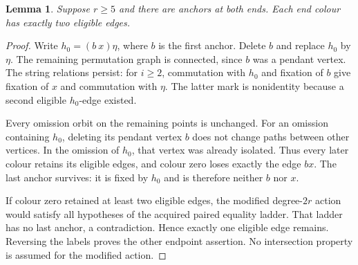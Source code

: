 \documentclass[11pt,a4paper]{article}
\newtheorem{lemma}{Lemma}
\begin{document}
\begin{lemma}\label{delete}
Suppose $r\ge5$ and there are anchors at both ends. Each end
colour has exactly two eligible edges.
\end{lemma}
\begin{proof}
Write $h_0=(b\ x)\eta$, where $b$ is the first anchor. Delete
$b$ and replace $h_0$ by $\eta$. The remaining permutation graph
is connected, since $b$ was a pendant vertex. The string relations
persist: for $i\ge2$, commutation with $h_0$ and fixation of $b$
give fixation of $x$ and commutation with $\eta$. The latter mark
is nonidentity because a second eligible $h_0$-edge existed.

Every omission orbit on the remaining points is unchanged. For
an omission containing $h_0$, deleting its pendant vertex $b$
does not change paths between other vertices. In the omission
of $h_0$, that vertex was already isolated. Thus every later
colour retains its eligible edges, and colour zero loses exactly
the edge $bx$. The last anchor survives: it is fixed by $h_0$
and is therefore neither $b$ nor $x$.

If colour zero retained at least two eligible edges, the modified
degree-$2r$ action would satisfy all hypotheses of the acquired
paired equality ladder. That ladder has no last anchor, a
contradiction. Hence exactly one eligible edge remains. Reversing
the labels proves the other endpoint assertion. No intersection
property is assumed for the modified action.
\end{proof}
\end{document}
